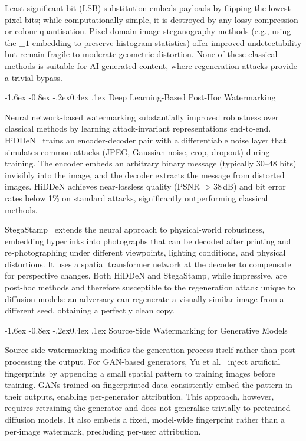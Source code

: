 \documentclass[10pt,twocolumn]{article}
\makeatletter
\renewcommand\subsection{\@startsection{subsection}{2}{\z@}%
  {-1.6ex \@plus -0.8ex \@minus -.2ex}{0.4ex \@plus .1ex}%
  {\normalfont\normalsize\itshape}}
\makeatother
\begin{document}
Least-significant-bit (LSB) substitution embeds payloads by flipping
the lowest pixel bits; while computationally simple, it is destroyed by
any lossy compression or colour quantisation.
Pixel-domain image steganography methods (e.g., using the $\pm 1$
embedding to preserve histogram statistics) offer improved
undetectability but remain fragile to moderate geometric distortion.
None of these classical methods is suitable for AI-generated content,
where regeneration attacks provide a trivial bypass.

\subsection{Deep Learning-Based Post-Hoc Watermarking}

Neural network-based watermarking substantially improved robustness
over classical methods by learning attack-invariant representations
end-to-end.
HiDDeN~\cite{zhu2018hidden} trains an encoder-decoder pair with a
differentiable noise layer that simulates common attacks (JPEG, Gaussian
noise, crop, dropout) during training.
The encoder embeds an arbitrary binary message (typically 30--48 bits)
invisibly into the image, and the decoder extracts the message from
distorted images.
HiDDeN achieves near-lossless quality (PSNR $> 38$\,dB) and bit error
rates below 1\% on standard attacks, significantly outperforming
classical methods.

StegaStamp~\cite{tancik2020stegastamp} extends the neural approach to
physical-world robustness, embedding hyperlinks into photographs that
can be decoded after printing and re-photographing under different
viewpoints, lighting conditions, and physical distortions.
It uses a spatial transformer network at the decoder to compensate for
perspective changes.
Both HiDDeN and StegaStamp, while impressive, are post-hoc methods and
therefore susceptible to the regeneration attack unique to diffusion
models: an adversary can regenerate a visually similar image from a
different seed, obtaining a perfectly clean copy.

\subsection{Source-Side Watermarking for Generative Models}

Source-side watermarking modifies the generation process itself rather
than post-processing the output.
For GAN-based generators, Yu et al.~\cite{yu2021artificial} inject
artificial fingerprints by appending a small spatial pattern to training
images before training.
GANs trained on fingerprinted data consistently embed the pattern in
their outputs, enabling per-generator attribution.
This approach, however, requires retraining the generator and does not
generalise trivially to pretrained diffusion models.
It also embeds a fixed, model-wide fingerprint rather than a
per-image watermark, precluding per-user attribution.
\end{document}
